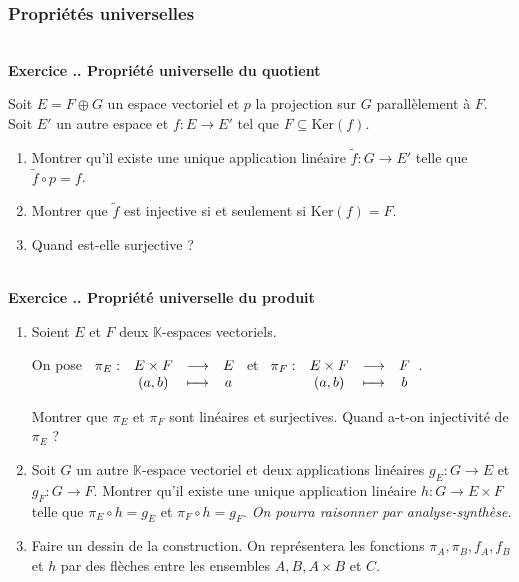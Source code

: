 \documentclass{article}
\newcommand{\fonction}[5]{\raisebox{-0.5\baselineskip}{$\begin{array}{lccc}
    #1: & #2 & \longrightarrow & #3 \\
        & #4 & \longmapsto & #5 \end{array}$}}
\newcommand{\mb}[1]{\mathbb{#1}}
\newcounter{exo}
\newcommand{\exercice}[1][\null]{\textbf{\\ Exercice \thesection.\theexo. #1} \addtocounter{exo}{1}}
\begin{document}
\subsubsection{Propriétés universelles}

\exercice[Propriété universelle du quotient]

Soit $E = F \oplus G$ un espace vectoriel et $p$ la projection sur $G$ parallèlement à $F$. Soit $E'$ un autre espace et $f : E \rightarrow E'$ tel que $F \subseteq \text{Ker}(f)$.

\begin{enumerate}

\item Montrer qu'il existe une unique application linéaire $\widetilde{f} : G \rightarrow E'$ telle que $\widetilde{f} \circ p = f$.

\item Montrer que $\widetilde{f}$ est injective si et seulement si $\text{Ker}(f) = F$.

\item Quand est-elle surjective ? 

\end{enumerate}




\exercice[Propriété universelle du produit]

\begin{enumerate}

\item Soient $E$ et $F$ deux $\mb{K}$-espaces vectoriels.

On pose $\fonction{\pi_E}{E\times F}{E}{(a,b)}{a}$ et $\fonction{\pi_F}{E\times F}{F}{(a,b)}{b}$.

Montrer que $\pi_E$ et $\pi_F$ sont linéaires et surjectives. Quand a-t-on injectivité de $\pi_E$ ?

\item Soit $G$ un autre $\mb{K}$-espace vectoriel et deux applications linéaires $g_E : G \rightarrow E$ et $g_F : G \rightarrow F$. Montrer qu'il existe une unique application linéaire $h : G \rightarrow E \times F$ telle que $\pi_E \circ h = g_E$ et $\pi_F \circ h = g_F$.  \emph{On pourra raisonner par analyse-synthèse.}

\item Faire un dessin de la construction. On représentera les fonctions $\pi_A, \pi_B, f_A, f_B$ et $h$ par des flèches entre les ensembles $A, B, A \times B$ et $C$.
\end{enumerate}
\end{document}
